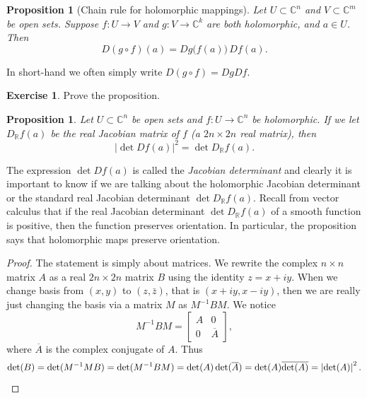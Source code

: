 \documentclass[12pt,openany]{book}
\newcommand{\abs}[1]{\left\lvert {#1} \right\rvert}
\newcommand{\C}{{\mathbb{C}}}
\newcommand{\R}{{\mathbb{R}}}
\newcommand{\myindex}[1]{#1\index{#1}}
\theoremstyle{plain}
\newtheorem{prop}[thm]{Proposition}
\theoremstyle{remark}
\theoremstyle{definition}
\newenvironment{exbox}{%
    \def\FrameCommand{\vrule width 1pt \relax\hspace {10pt}}%
    \MakeFramed {\advance \hsize -\width \FrameRestore }%
}{%
    \endMakeFramed
}
\theoremstyle{exercise}
\newtheorem{exercise}{Exercise}[section]
\theoremstyle{example}
\begin{document}
\begin{prop}[Chain rule for holomorphic mappings]
Let $U \subset \C^n$ and $V \subset \C^m$ be open sets.  Suppose
$f \colon U \to V$ and $g \colon V \to \C^k$ are both holomorphic,
and $a \in U$.  Then
\begin{equation*}
D(g \circ f)(a) = Dg\bigl(f(a)\bigr) \, Df(a) .
\end{equation*}
\end{prop}

In short-hand we often simply write $D(g \circ f) = Dg Df$.

\begin{exbox}
\begin{exercise}
Prove the proposition.
\end{exercise}
\end{exbox}

\begin{prop}
Let $U \subset \C^n$ be open sets and 
$f \colon U \to \C^n$ be holomorphic.
If we let $D_\R f (a)$ be the real
Jacobian matrix of $f$ (a $2n \times 2n$ real matrix), then
\begin{equation*}
\abs{\det D f(a) }^2 = 
\det D_\R f(a) .
\end{equation*}
\end{prop}

The expression $\det D f(a)$ is called the \emph{\myindex{Jacobian
determinant}} and clearly it is important to know if we are talking about
the holomorphic Jacobian determinant or the standard real Jacobian
determinant $\det D_\R f(a)$.  Recall from vector calculus that
if the real Jacobian determinant $\det D_\R
f(a)$ of a smooth function is positive, then the function preserves
orientation.  In particular, the proposition
says that holomorphic maps preserve orientation.

\begin{proof}
The statement is simply about matrices.
We rewrite the complex $n \times n$
matrix $A$ as a real $2n \times 2n$ matrix $B$ using the
identity $z=x+iy$.
When we change basis from $(x,y)$ to $(z,\bar{z})$,
that is
$(x+iy,x-iy)$, then we are really just changing the basis via a matrix $M$ as
$M^{-1} B M$.  We notice
\begin{equation*}
M^{-1} B M =
\begin{bmatrix}
A & 0 \\
0 & \overline{A}
\end{bmatrix} ,
\end{equation*}
where $\overline{A}$ is the complex conjugate of $A$.  Thus
\begin{equation*}
\det (B) =
\det(M^{-1}M B)
=
\det(M^{-1} B M)
=
\det(A) \det(\overline{A})
=
\det(A) \overline{\det(A)}
=
\abs{\det(A)}^2 . \qedhere
\end{equation*}
\end{proof}
\end{document}
